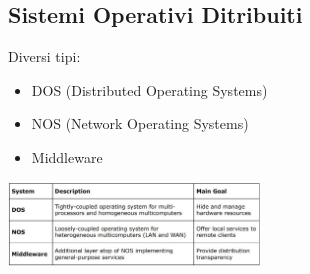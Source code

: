 \subsection{Sistemi Operativi Ditribuiti}
Diversi tipi: 
\begin{itemize}
    \item DOS (Distributed Operating Systems)
    \item NOS (Network Operating Systems)
    \item Middleware
\end{itemize}
\begin{center}
    \includegraphics[width=0.5\textwidth]{img/sistemiOperativiDistribuiti1.jpg}
\end{center}

